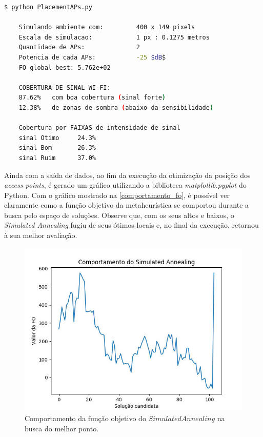 \documentclass[
	12pt,				%
	twoside,			%
	a4paper,			%
	english,			%
	french,				%
	spanish,			%
	brazil				%
	]{abntex2}
\begin{document}
\begin{lstlisting}[language=bash]
    $ python PlacementAPs.py 

    Simulando ambiente com:         400 x 149 pixels
    Escala de simulacao:            1 px : 0.1275 metros
    Quantidade de APs:              2
    Potencia de cada APs:           -25 $dB$
    FO global best: 5.762e+02

    COBERTURA DE SINAL WI-FI:
    87.62%   com boa cobertura (sinal forte)
    12.38%   de zonas de sombra (abaixo da sensibilidade)

    Cobertura por FAIXAS de intensidade de sinal
    sinal Otimo     24.3%
    sinal Bom       26.3%
    sinal Ruim      37.0%

\end{lstlisting}

Ainda com a saída de dados, ao fim da execução da otimização da posição
dos \emph{access points}, é gerado um gráfico utilizando a biblioteca
\emph{matplotlib.pyplot} do Python. Com o gráfico mostrado na
\autoref{comportamento_fo}, é possível ver claramente como a função
objetivo da metaheurística se comportou durante a busca pelo espaço de
soluções. Observe que, com os seus altos e baixos, o \emph{Simulated
Annealing} fugiu de seus ótimos locais e, no final da execução, retornou
à sua melhor avaliação.

\begin{figure}[ht]
    \caption{\label{comportamento_fo} Comportamento da função objetivo do $Simulated Annealing$ na busca do melhor ponto.}
    \begin{center}
        \includegraphics[scale=0.5]{imagens/comportamento-fo.jpg}
    \end{center}
\end{figure}
\end{document}
